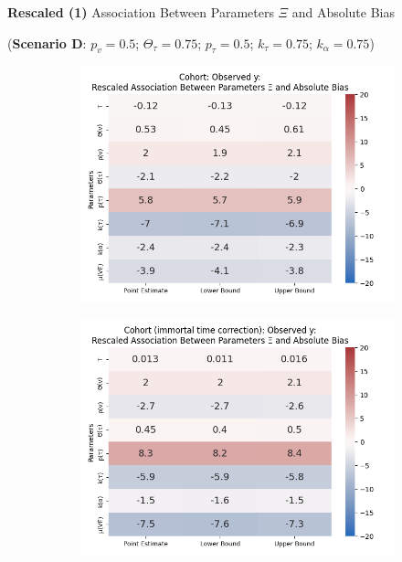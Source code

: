 \documentclass[aspectratio=169]{beamer}
\begin{document}
\begin{frame}{\textbf{Rescaled (1)} Association Between Parameters $\Xi$ and Absolute Bias}
	\begin{center}
		(\textbf{Scenario D}: $p_v=0.5$; $\Theta_{\tau}=0.75$; $p_\tau=0.5$; $k_\tau=0.75$; $k_\alpha=0.75$)
	\end{center}
	\begin{figure}[H]
		\centering		
		\begin{subfigure}[t]{0.23\linewidth}
			\centering
			\includegraphics[scale=0.25]{VEMethod_Drivers1b_FEest_Realistic_Li_MSpec_Heatmap5.png}
		\end{subfigure}
		\begin{subfigure}[t]{0.23\linewidth}
			\centering
			\includegraphics[scale=0.25]{VEMethod_Drivers1b_FEest_Realistic_Li_MSpec_Heatmap6.png}

\end{subfigure}
\end{figure}
\end{frame}
\end{document}
